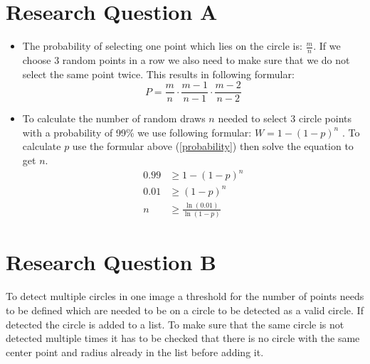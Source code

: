 \section{Research Question A}
\begin{itemize}
	\item The probability of selecting one point which lies on the circle is: $\frac{m}{n}$. If we choose 3 random points in a row we also need to make sure that we do not select the same point twice. This results in following formular:
	\begin{equation}
	P = \frac{m}{n} \cdot \frac{m-1}{n-1} \cdot \frac{m-2}{n-2}\label{probability}
	\end{equation}
	\item To calculate the number of random draws $n$ needed to select 3 circle points with a probability of 99\% we use following formular: $W = 1-(1-p)^n$ \cite{DanielaEder2020}. To calculate $p$  use the formular above (\ref{probability}) then solve the equation to get $n$.
	\begin{align}
	0.99& \geq 1 - (1-p)^n\\
	0.01& \geq (1-p)^n\\
	n& \geq \frac{\ln(0.01)}{\ln(1-p)}
	\end{align}
\end{itemize}

\section{Research Question B}

To detect multiple circles in one image a threshold for the number of points needs to be defined which are needed to be on a circle to be detected as a valid circle. If detected the circle is added to a list. To make sure that the same circle is not detected multiple times it has to be checked that there is no circle with the same center point and radius already in the list before adding it.